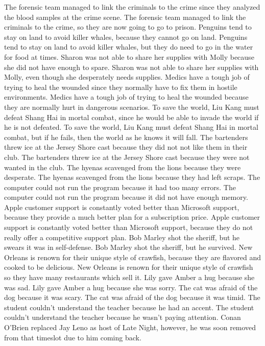 \documentclass{article}
\begin{document}
\begin{enumerate}
	The forensic team managed to link the criminals to the crime since they analyzed the blood samples at the crime scene.
	The forensic team managed to link the criminals to the crime, so they are now going to go to prison.
	Penguins tend to stay on land to avoid killer whales, because they cannot go on land.
	Penguins tend to stay on land to avoid killer whales, but they do need to go in the water for food at times.
	Sharon was not able to share her supplies with Molly because she did not have enough to spare.
	Sharon was not able to share her supplies with Molly, even though she desperately needs supplies.
	Medics have a tough job of trying to heal the wounded since they normally have to fix them in hostile environments.
	Medics have a tough job of trying to heal the wounded because they are normally hurt in dangerous scenarios.
	To save the world, Liu Kang must defeat Shang Hai in mortal combat, since he would be able to invade the world if he is not defeated.
	To save the world, Liu Kang must defeat Shang Hai in mortal combat, but if he fails, then the world as he knows it will fall.
	The bartenders threw ice at the Jersey Shore cast because they did not not like them in their club.
	The bartenders threw ice at the Jersey Shore cast because they were not wanted in the club.
	The hyenas scavenged from the lions because they were desperate.
	The hyenas scavenged from the lions because they had left scraps.
	The computer could not run the program because it had too many errors.
	The computer could not run the program because it did not have enough memory.
	Apple customer support is constantly voted better than Microsoft support, because they provide a much better plan for a subscription price.
	Apple customer support is constantly voted better than Microsoft support, because they do not really offer a competitive support plan.
	Bob Marley shot the sheriff, but he swears it was in self-defense.
	Bob Marley shot the sheriff, but he survived.
	New Orleans is renown for their unique style of crawfish, because they are flavored and cooked to be delicious.
	New Orleans is renown for their unique style of crawfish so they have many restaurants which sell it.
	Lily gave Amber a hug because she was sad.
	Lily gave Amber a hug because she was sorry.
	The cat was afraid of the dog because it was scary.
	The cat was afraid of the dog because it was timid.
	The student couldn't understand the teacher because he had an accent.
	The student couldn't understand the teacher because he wasn't paying attention.
	Conan O'Brien replaced Jay Leno as host of Late Night, however, he was soon removed from that timeslot due to him coming back.

\end{enumerate}
\end{document}
